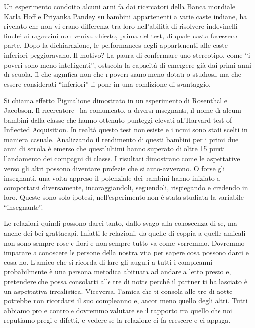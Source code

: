 \documentclass[12pt]{book} %
\begin{document}
\bigskip

Un esperimento condotto alcuni anni fa dai ricercatori della Banca mondiale Karla Hoff e Priyanka Pandey su bambini
appartenenti a varie caste indiane, ha rivelato che non vi erano differenze tra loro nell'abilità di risolvere
indovinelli finché ai ragazzini non veniva chiesto, prima del test, di quale casta facessero parte. Dopo la
dichiarazione, le performances degli appartenenti alle caste inferiori peggioravano. Il motivo? La paura di confermare
uno stereotipo, come “i poveri sono meno intelligenti”, ostacola la capacità di emergere già dai primi anni di scuola.
Il che significa non che i poveri siano meno dotati o studiosi, ma che essere considerati “inferiori” li pone in una
condizione di svantaggio. 

Si chiama effetto Pigmalione dimostrato in un esperimento di Rosenthal e Jacobson. Il ricercatore \ ha comunicato, a
diversi insegnanti, il nome di alcuni bambini della classe che hanno ottenuto punteggi elevati
all'Harvard test of Inflected Acquisition. In realtà questo test non esiste e i nomi sono stati
scelti in maniera casuale. Analizzando il rendimento di questi bambini per i primi due anni di scuola è emerso che
quest'ultimi hanno superato di oltre 15 punti l'andamento dei compagni di
classe. I risultati dimostrano come le aspettative verso gli altri possono diventare profezie che si auto-avverano. O
forse gli insegnanti, una volta appreso il potenziale dei bambini hanno iniziato a comportarsi diversamente,
incoraggiandoli, seguendoli, rispiegando e credendo in loro. Queste sono solo ipotesi,
nell'esperimento non è stata studiata la variabile “insegnante”.


\bigskip

Le relazioni quindi possono darci tanto, dallo svago alla conoscenza di se, ma anche dei bei grattacapi. Infatti le
relazioni, da quelle di coppia a quelle amicali non sono sempre rose e fiori e non sempre tutto va come vorremmo.
Dovremmo imparare a conoscere le persone della nostra vita per sapere cosa possono darci e cosa no.
L'amico che si ricorda di fare gli auguri a tutti i compleanni probabilmente è una persona
metodica abituata ad andare a letto presto e, pretendere che possa consolarti alle tre di notte perché il partner ti ha
lasciato è un aspettativa irrealistica. Viceversa, l'amica che ti consola alle tre di notte
potrebbe non ricordarsi il suo compleanno e, ancor meno quello degli altri. Tutti abbiamo pro e contro e dovremmo
valutare se il rapporto tra quello che noi reputiamo pregi e difetti, e vedere se la relazione ci fa crescere e ci
appaga.
\end{document}
